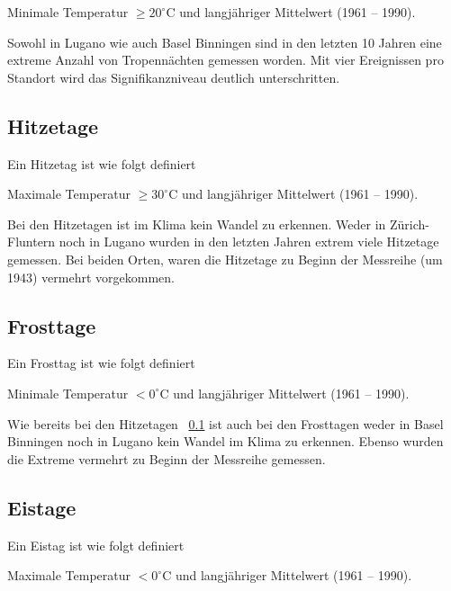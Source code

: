 \begin{refsection}
\begin{definition}
Minimale Temperatur $\ge 20^{\circ}$C und langjähriger Mittelwert (1961 -- 1990).
\end{definition}

Sowohl in Lugano wie auch Basel Binningen sind in den letzten 10 Jahren eine extreme Anzahl von Tropennächten gemessen worden. Mit vier Ereignissen pro Standort wird das Signifikanzniveau deutlich unterschritten.


\subsection{Hitzetage} \label{Hitzetage}

Ein Hitzetag ist wie folgt definiert

\begin{definition}
Maximale Temperatur $\ge 30^{\circ}$C und langjähriger Mittelwert (1961 -- 1990).
\end{definition}

Bei den Hitzetagen ist im Klima kein Wandel zu erkennen. Weder in Zürich-Fluntern noch in Lugano wurden in den letzten Jahren extrem viele Hitzetage gemessen. Bei beiden Orten, waren die Hitzetage zu Beginn der Messreihe (um 1943) vermehrt vorgekommen.


\subsection{Frosttage}
Ein Frosttag ist wie folgt definiert

\begin{definition}
Minimale Temperatur $< 0^{\circ}$C und langjähriger Mittelwert (1961 -- 1990).
\end{definition}

Wie bereits bei den Hitzetagen ~\ref{Hitzetage}  ist auch bei den Frosttagen weder in Basel Binningen noch in Lugano kein Wandel im Klima zu erkennen. Ebenso wurden die Extreme vermehrt zu Beginn der Messreihe gemessen.


\subsection{Eistage}
Ein Eistag ist wie folgt definiert

\begin{definition}
Maximale Temperatur $< 0^{\circ}$C und langjähriger Mittelwert (1961 -- 1990).
\end{definition}


\end{refsection}
